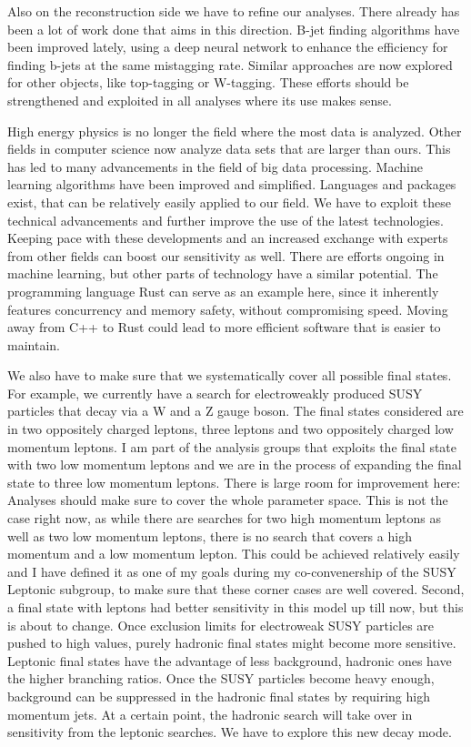 \documentclass[]{cv} %
\begin{document}
\begin{statement}
Also on the reconstruction side we have to refine our analyses. There already
has been a lot of work done that aims in this direction. B-jet finding
algorithms have been improved lately, using a deep neural network to enhance the
efficiency for finding b-jets at the same mistagging rate. Similar approaches
are now explored for other objects, like top-tagging or W-tagging. These efforts
should be strengthened and exploited in all analyses where its use makes sense.

High energy physics is no longer the field where the most data is analyzed.
Other fields in computer science now analyze data sets that are larger than
ours. This has led to many advancements in the field of big data processing.
Machine learning algorithms have been improved and simplified. Languages and
packages exist, that can be relatively easily applied to our field. We have to
exploit these technical advancements and further improve the use of the latest
technologies. Keeping pace with these developments and an increased exchange
with experts from other fields can boost our sensitivity as well. There are
efforts ongoing in machine learning, but other parts of technology have a
similar potential. The programming language Rust can serve as an example here,
since it inherently features concurrency and memory safety, without compromising
speed. Moving away from C++ to Rust could lead to more efficient software that
is easier to maintain.

We also have to make sure that we systematically cover all possible final
states. For example, we currently have a search for electroweakly produced SUSY
particles that decay via a W and a Z gauge boson. The final states considered
are in two oppositely charged leptons, three leptons and two oppositely charged
low momentum leptons. I am part of the analysis groups that exploits the final
state with two low momentum leptons and we are in the process of expanding the
final state to three low momentum leptons. There is large room for improvement
here: Analyses should make sure to cover the whole parameter space. This is not
the case right now, as while there are searches for two high momentum leptons as
well as two low momentum leptons, there is no search that covers a high momentum
and a low momentum lepton. This could be achieved relatively easily and I have
defined it as one of my goals during my co-convenership of the SUSY Leptonic
subgroup, to make sure that these corner cases are well covered. Second, a final
state with leptons had better sensitivity in this model up till now, but this is
about to change. Once exclusion limits for electroweak SUSY particles are pushed
to high values, purely hadronic final states might become more sensitive.
Leptonic final states have the advantage of less background, hadronic ones have
the higher branching ratios. Once the SUSY particles become heavy enough,
background can be suppressed in the hadronic final states by requiring high
momentum jets. At a certain point, the hadronic search will take over in
sensitivity from the leptonic searches. We have to explore this new decay mode.


\end{statement}
\end{document}
